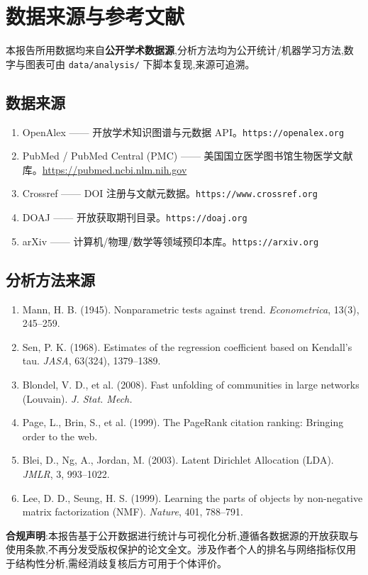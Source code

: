\section{数据来源与参考文献}

\begin{plainbox}
本报告所用数据均来自\textbf{公开学术数据源},分析方法均为公开统计/机器学习方法,数字与图表可由 \texttt{data/analysis/} 下脚本复现,来源可追溯。
\end{plainbox}

\subsection{数据来源}
\begin{enumerate}[label=D\arabic*.]
\item OpenAlex —— 开放学术知识图谱与元数据 API。\texttt{https://openalex.org}
\item PubMed / PubMed Central (PMC) —— 美国国立医学图书馆生物医学文献库。\url{https://pubmed.ncbi.nlm.nih.gov}
\item Crossref —— DOI 注册与文献元数据。\texttt{https://www.crossref.org}
\item DOAJ —— 开放获取期刊目录。\texttt{https://doaj.org}
\item arXiv —— 计算机/物理/数学等领域预印本库。\texttt{https://arxiv.org}
\end{enumerate}

\subsection{分析方法来源}
\begin{enumerate}[label=R\arabic*.]
\item Mann, H. B. (1945). Nonparametric tests against trend. \textit{Econometrica}, 13(3), 245--259.
\item Sen, P. K. (1968). Estimates of the regression coefficient based on Kendall's tau. \textit{JASA}, 63(324), 1379--1389.
\item Blondel, V. D., et al. (2008). Fast unfolding of communities in large networks (Louvain). \textit{J. Stat. Mech.}
\item Page, L., Brin, S., et al. (1999). The PageRank citation ranking: Bringing order to the web.
\item Blei, D., Ng, A., Jordan, M. (2003). Latent Dirichlet Allocation (LDA). \textit{JMLR}, 3, 993--1022.
\item Lee, D. D., Seung, H. S. (1999). Learning the parts of objects by non-negative matrix factorization (NMF). \textit{Nature}, 401, 788--791.
\end{enumerate}

\begin{plainbox}
\textbf{合规声明}:本报告基于公开数据进行统计与可视化分析,遵循各数据源的开放获取与使用条款,不再分发受版权保护的论文全文。涉及作者个人的排名与网络指标仅用于结构性分析,需经消歧复核后方可用于个体评价。
\end{plainbox}

\clearpage
